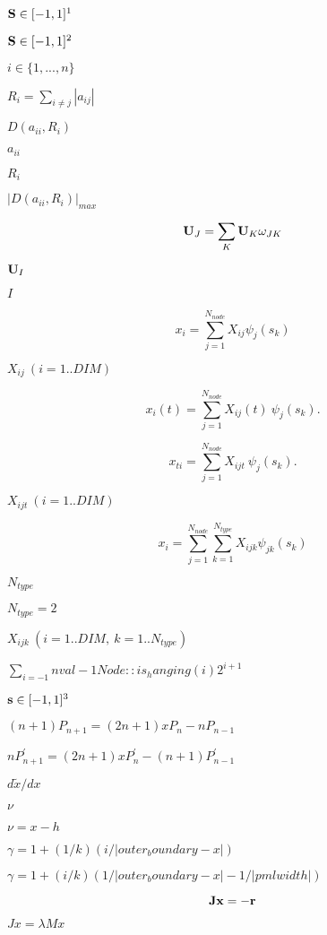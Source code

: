 \documentclass{article}
\begin{document}
$ {\bf S} \in [-1,1]^1  $
\pagebreak

$ {\bf S} \in [-1,1]^2  $
\pagebreak

$ i \in \{ 1,...,n \} $
\pagebreak

$ R_i = \sum_{i\neq j} |a_{ij}| $
\pagebreak

$ D(a_{ii},R_i) $
\pagebreak

$ a_{ii} $
\pagebreak

$ R_i $
\pagebreak

$ |D(a_{ii},R_i)|_{max} $
\pagebreak

\[ {\bf U}_J = \sum_{K} {\bf U}_{K} \omega_{JK} \]
\pagebreak

$ {\bf U}_I $
\pagebreak

$ I $
\pagebreak

\[ x_i = \sum_{j=1}^{N_{node}} X_{ij} \psi_{j}(s_k) \]
\pagebreak

$ X_{ij}\ (i=1..DIM) $
\pagebreak

\[ x_i(t) = \sum_{j=1}^{N_{node}} X_{ij}(t) \ \psi_{j}(s_k). \]
\pagebreak

\[ x_{ti} = \sum_{j=1}^{N_{node}} X_{ijt} \ \psi_{j}(s_k). \]
\pagebreak

$ X_{ijt} \ (i=1..DIM) $
\pagebreak

\[ x_i = \sum_{j=1}^{N_{node}} \sum_{k=1}^{N_{type}} X_{ijk} \psi_{jk}(s_k) \]
\pagebreak

$ N_{type} $
\pagebreak

$ N_{type}=2 $
\pagebreak

$ X_{ijk}  \ (i=1..DIM, \ k=1..N_{type}) $
\pagebreak

$  \sum_{i=-1}{nval-1} Node::is_hanging(i) 2^{i+1} $
\pagebreak

$ {\bf s} \in [-1,1]^3 $
\pagebreak

$ (n+1) P_{n+1} = (2n+1)xP_{n} - nP_{n-1} $
\pagebreak

$ nP_{n+1}^{'} = (2n+1)xP_{n}^{'} - (n+1)P_{n-1}^{'} $
\pagebreak

$d\tilde x / d x$
\pagebreak

$\nu$
\pagebreak

$\nu = x - h$
\pagebreak

$\gamma=1 + (1/k)(i/|outer_boundary - x|)$
\pagebreak

$\gamma=1 + (i/k)(1/|outer_boundary - x|-1/|pml width|)$
\pagebreak

\[ {\bf J} {\bf x} = - \bf{r} \]
\pagebreak

$ Jx = \lambda M x$
\pagebreak
\end{document}

